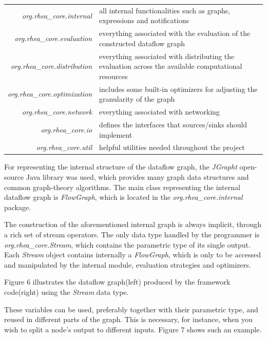 \documentclass{dithesis}
\begin{document}
\begin{tabularx}{\textwidth}{rX}
	\textit{org.rhea\_core.internal} 
	& all internal functionalities such as graphs, expressions and notifications \\
	\textit{org.rhea\_core.evaluation}
	& everything associated with the evaluation of the constructed dataflow graph \\
	\textit{org.rhea\_core.distribution}
	& everything associated with distributing the evaluation across the available computational resources \\
	\textit{org.rhea\_core.optimization}	
	& includes some built-in optimizers for adjusting the  granularity of the graph \\
	\textit{org.rhea\_core.network}	
	& everything associated with networking \\
	\textit{org.rhea\_core.io}
	& defines the interfaces that sources/sinks should implement \\
	\textit{org.rhea\_core.util}
	& helpful utilities needed throughout the project \\
\end{tabularx}


For representing the internal structure of the dataflow graph, the \textit{JGrapht} open-source Java library was used, which provides many graph data structures and common graph-theory algorithms. The main class representing the internal dataflow graph is \textit{FlowGraph},  which is located in the \textit{org.rhea\_core.internal} package.


The construction of the aforementioned internal graph is always implicit, through a rich set of stream operators. The only data type handled by the programmer is \textit{org.rhea\_core.Stream}, which contains the parametric type of its single output. Each \textit{Stream} object contains internally a \textit{FlowGraph}, which is only to be accessed and manipulated by the internal module, evaluation strategies and optimizers.

Figure 6 illustrates the dataflow graph(left) produced by the framework code(right) using the \textit{Stream} data type.


These variables can be used, preferably together with their parametric type, and reused in different parts of the graph. This is necessary, for instance, when you wish to split a node's output to different inputs. Figure 7 shows such an example.
\end{document}
